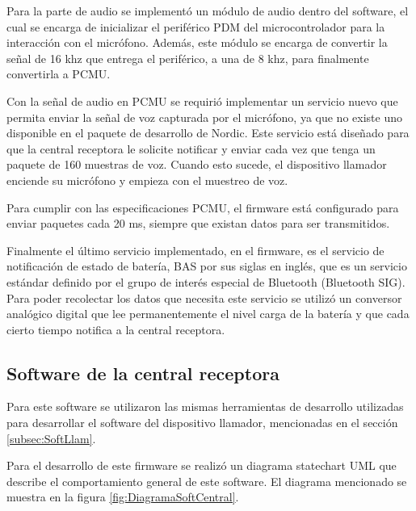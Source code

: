 Para la parte de audio se implementó un módulo de audio dentro del software, el cual se encarga de inicializar el periférico PDM del microcontrolador para la interacción con el micrófono. Además, este módulo se encarga de convertir la señal de 16 khz que entrega el periférico, a una de 8 khz,  para finalmente convertirla a PCMU.

Con la señal de audio en PCMU se requirió implementar un servicio nuevo que permita enviar la señal de voz capturada por el micrófono, ya que no existe uno disponible en el paquete de desarrollo de Nordic. Este servicio está diseñado para que la central receptora le solicite notificar y enviar cada vez que tenga un paquete de 160 muestras de voz. Cuando esto sucede, el dispositivo llamador enciende su micrófono y empieza con el muestreo de voz.

Para cumplir con las especificaciones PCMU, el firmware está configurado para enviar paquetes cada 20 ms, siempre que existan datos para ser transmitidos.

Finalmente el último servicio implementado, en el firmware, es el servicio de notificación de estado de batería, BAS por sus siglas en inglés, que es un servicio estándar definido por el grupo de interés especial de Bluetooth (Bluetooth SIG). Para poder recolectar los datos que necesita este servicio se utilizó un conversor analógico digital que lee permanentemente el nivel carga de la batería y que cada cierto tiempo notifica a la central receptora.

\subsection{Software de la central receptora}
\label{subsec:SoftCentral}

Para este software se utilizaron las mismas herramientas de desarrollo utilizadas para desarrollar el software del dispositivo llamador, mencionadas en el sección \ref{subsec:SoftLlam}.

Para el desarrollo de este firmware se realizó un diagrama statechart UML que describe el comportamiento general de este software. El diagrama mencionado se muestra en la figura \ref{fig:DiagramaSoftCentral}.

